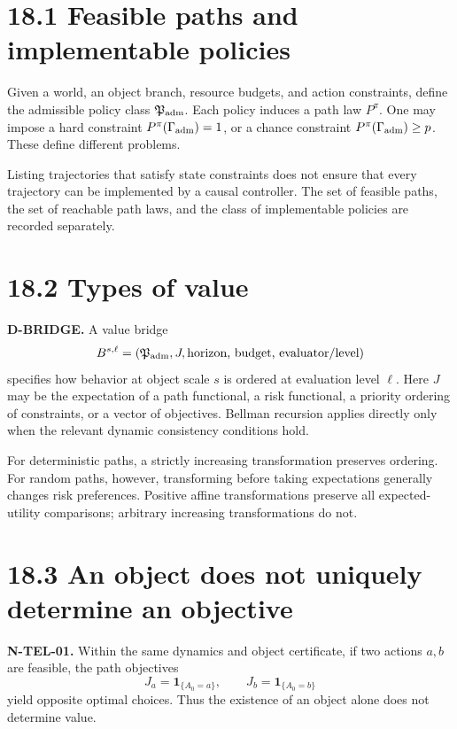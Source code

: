 \documentclass[
  english,
  11pt,
  oneside]{book}
\begin{document}
\section{18.1 Feasible paths and implementable policies}\label{feasible-paths-and-implementable-policies}

Given a world, an object branch, resource budgets, and action constraints, define the admissible policy class \(\mathfrak P_{\rm adm}\). Each policy induces a path law \(P^\pi\). One may impose a hard constraint \(P^\pi(\Gamma_{\rm adm})=1\), or a chance constraint \(P^\pi(\Gamma_{\rm adm})\ge p\). These define different problems.

Listing trajectories that satisfy state constraints does not ensure that every trajectory can be implemented by a causal controller. The set of feasible paths, the set of reachable path laws, and the class of implementable policies are recorded separately.

\section{18.2 Types of value}\label{types-of-value}

\textbf{D-BRIDGE.} A value bridge \[B^{s,\ell}=
(\mathfrak P_{\rm adm},J,\text{horizon, budget, evaluator/level})\] specifies how behavior at object scale \(s\) is ordered at evaluation level \(\ell\). Here \(J\) may be the expectation of a path functional, a risk functional, a priority ordering of constraints, or a vector of objectives. Bellman recursion applies directly only when the relevant dynamic consistency conditions hold.

For deterministic paths, a strictly increasing transformation preserves ordering. For random paths, however, transforming before taking expectations generally changes risk preferences. Positive affine transformations preserve all expected-utility comparisons; arbitrary increasing transformations do not.

\section{18.3 An object does not uniquely determine an objective}\label{an-object-does-not-uniquely-determine-an-objective}

\textbf{N-TEL-01.} Within the same dynamics and object certificate, if two actions \(a,b\) are feasible, the path objectives \[J_a=\mathbf1_{\{A_0=a\}},\qquad J_b=\mathbf1_{\{A_0=b\}}\] yield opposite optimal choices. Thus the existence of an object alone does not determine value.
\end{document}
